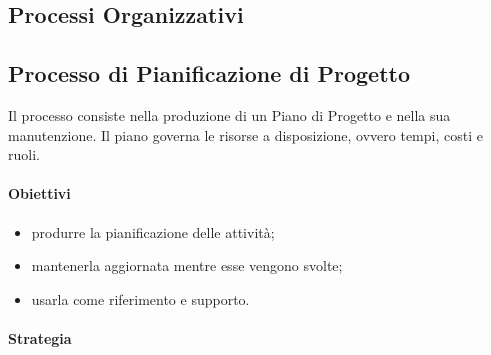 \subsection{Processi Organizzativi}
	\subsection{Processo di Pianificazione di Progetto}
	Il processo consiste nella produzione di un Piano di Progetto e nella sua manutenzione. Il piano governa le risorse a disposizione, ovvero tempi, costi e ruoli.
		\paragraph{Obiettivi}
		\begin{itemize}
			\item produrre la pianificazione delle attività;
			\item mantenerla aggiornata mentre esse vengono svolte;
			\item usarla come riferimento e supporto.
		\end{itemize}
		\paragraph{Strategia}
